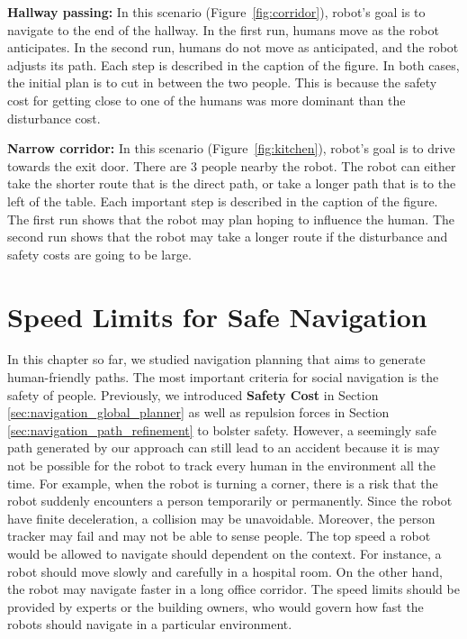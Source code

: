 \textbf{Hallway passing: } In this scenario (Figure~\ref{fig:corridor}), robot's goal is to navigate to the end of the hallway. In the first run, humans move as the robot anticipates. In the second run, humans do not move as anticipated, and the robot adjusts its path. Each step is described in the caption of the figure. In both cases, the initial plan is to cut in between the two people. This is because the safety cost for getting close to one of the humans was more dominant than the disturbance cost.

\textbf{Narrow corridor:} In this scenario (Figure~\ref{fig:kitchen}), robot's goal is to drive towards the exit door. There are 3 people nearby the robot. The robot can either take the shorter route that is the direct path, or take a longer path that is to the left of the table. Each important step is described in the caption of the figure. The first run shows that the robot may plan hoping to influence the human. The second run shows that the robot may take a longer route if the disturbance and safety costs are going to be large.



\section{Speed Limits for Safe Navigation}
\label{sec:navigation_speed_limits}

In this chapter so far, we studied navigation planning that aims to generate human-friendly paths. The most important criteria for social navigation is the safety of people. Previously, we introduced \textbf{Safety Cost} in Section \ref{sec:navigation_global_planner} as well as repulsion forces in Section \ref{sec:navigation_path_refinement} to bolster safety. However, a seemingly safe path generated by our approach can still lead to an accident because it is may not be possible for the robot to track every human in the environment all the time. For example, when the robot is turning a corner, there is a risk that the robot suddenly encounters a person temporarily or permanently. Since the robot have finite deceleration, a collision may be unavoidable. Moreover, the person tracker may fail and may not be able to sense people. The top speed a robot would be allowed to navigate should dependent on the context. For instance, a robot should move slowly and carefully in a hospital room. On the other hand, the robot may navigate faster in a long office corridor. The speed limits should be provided by experts or the building owners, who would govern how fast the robots should navigate in a particular environment.

